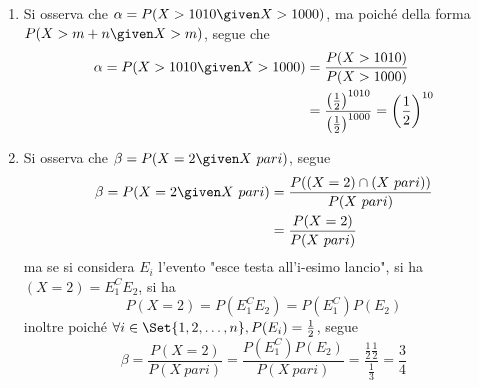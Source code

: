 \documentclass{subfiles}
\begin{document}
\begin{Example*}
\begin{enumerate}
        \item Si osserva che \(\alpha = P(X > 1010 \given X > 1000)\), ma poiché della forma \(P(X > m + n  \given X > m)\), segue che
              \[\begin{aligned}
                      \alpha = P(X > 1010 \given X > 1000) & = \frac{P(X > 1010)}{P(X > 1000)}                                                                         \\
                                                           & = \frac{\left(\frac{1}{2}\right)^{1010}}{\left(\frac{1}{2}\right)^{1000}} = \left(\frac{1}{2}\right)^{10}
                  \end{aligned}\]

        \item Si osserva che \(\beta = P(X = 2 \given X \ pari)\), segue
              \[\begin{aligned}
                      \beta = P(X = 2 \given X \ pari) & = \frac{P((X = 2) \cap (X \ pari))}{P(X \ pari)} \\
                                                       & = \frac{P(X = 2)}{P(X \ pari)}
                  \end{aligned}\]
              ma se si considera \(E_{i}\) l'evento "esce testa all'i-esimo lancio", si ha \((X = 2) = E_{1}^{C}E_{2}\), si ha
              \[
                  P(X = 2) = P(E_{1}^{C}E_{2}) = P(E_{1}^{C})P(E_{2})
              \]
              inoltre poiché \(\forall i \in \Set{1, 2, \dots, n}, P(E_{i}) = \tfrac{1}{2}\), segue
              \[
                  \beta = \frac{P(X = 2)}{P(X \ pari)} = \frac{P(E_{1}^{C})P(E_{2})}{P(X \ pari)} = \frac{\frac{1}{2} \frac{1}{2}}{\frac{1}{3}} = \frac{3}{4}
              \]
    \end{enumerate}
\end{Example*}
\end{document}
